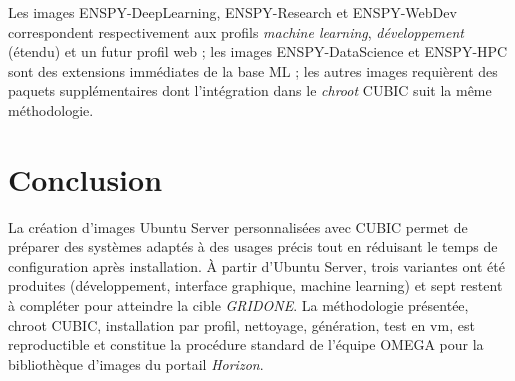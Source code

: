 Les images ENSPY-DeepLearning, ENSPY-Research et ENSPY-WebDev correspondent respectivement aux profils \emph{machine learning}, \emph{développement} (étendu) et un futur profil web ; les images ENSPY-DataScience et ENSPY-HPC sont des extensions immédiates de la base ML ; les autres images requièrent des paquets supplémentaires dont l'intégration dans le \emph{chroot} CUBIC suit la même méthodologie.

\section{Conclusion}

La création d'images Ubuntu Server personnalisées avec CUBIC permet de préparer des systèmes adaptés à des usages précis tout en réduisant le temps de configuration après installation. À partir d'Ubuntu Server, trois variantes ont été produites (développement, interface graphique, machine learning) et sept restent à compléter pour atteindre la cible \emph{GRIDONE}. La méthodologie présentée, chroot CUBIC, installation par profil, nettoyage, génération, test en \acrshort{vm}, est reproductible et constitue la procédure standard de l'équipe OMEGA pour la bibliothèque d'images du portail \emph{Horizon}.
